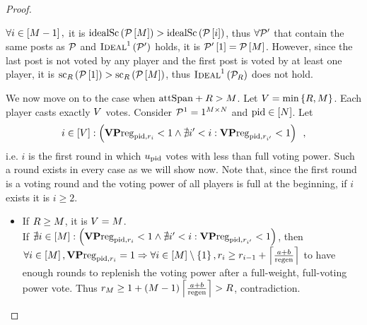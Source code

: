 \begin{proof}
\begin{itemize}
    $\forall i \in \left[\postlen - 1\right],$ it is
    $\idsc{\postlist\left[\postlen\right]} >
    \idsc{\postlist\left[i\right]}$, thus $\forall \postlist'$ that
    contain the same posts as $\postlist$ and
    $\textsc{Ideal}^1\left(\postlist'\right)$ holds, it is
    $\postlist'\left[1\right] = \postlist\left[\postlen\right]$. However,
    since the last post is not voted by any player and the first post is voted
    by at least one player, it is
    $\mathrm{sc}_\rounds\left(\postlist\left[1\right]\right) >
    \mathrm{sc}_\rounds\left(\postlist\left[\postlen\right]\right)$, thus
    $\textsc{Ideal}^1\left(\postlist_\rounds\right)$ does not hold.

    We now move on to the case when $\attspan + \rounds > \postlen$. Let
    $\votenum = \min{\left\{\rounds, \postlen\right\}}$. Each player casts
    exactly $\votenum$ votes. Consider $\postlist^1 = 1^{\postlen \times
    \playerlen}$ and $\pid \in \left[\playerlen\right]$. Let
    \begin{equation*}
      i \in \left[\votenum\right] :\left(\votpowvecreg_{\pid, \round_i} < 1
      \wedge \nexists i' < i: \votpowvecreg_{\pid, \round_{i'}} < 1\right)
      \enspace,
    \end{equation*}
    i.e. $i$ is the first round in which $u_\pid$ votes with less than full
    voting power. Such a round exists in every case as we will show now. Note
    that, since the first round is a voting round and the voting power of all
    players is full at the beginning, if $i$ exists it is $i \geq 2$.

    \begin{itemize}
      \item If $\rounds \geq \postlen$, it is $\votenum = \postlen$. \\
      If $\nexists i \in \left[\postlen\right] :\left(\votpowvecreg_{\pid,
      \round_i} < 1 \wedge \nexists i' < i: \votpowvecreg_{\pid, \round_{i'}} <
      1\right)$, then $\forall i \in \left[\postlen\right], \votpowvecreg_{\pid,
      \round_i} = 1 \Rightarrow \forall i \in \left[\postlen\right] \setminus
      \left\{1\right\}, \round_i \geq \round_{i - 1} + \ceil*{\frac{a +
      b}{\regen}}$ to have enough rounds to replenish the voting power after a
      full-weight, full-voting power vote. Thus $\round_\postlen \geq 1 +
      \left(\postlen - 1\right)\ceil*{\frac{a + b}{\regen}} > \rounds$,
      contradiction.


\end{itemize}
\end{itemize}
\end{proof}
